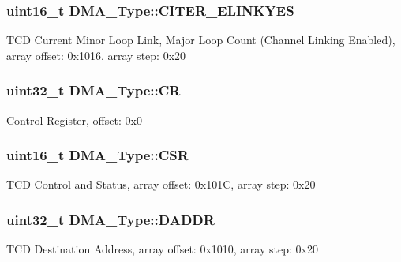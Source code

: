 \subsubsection[{\texorpdfstring{C\+I\+T\+E\+R\+\_\+\+E\+L\+I\+N\+K\+Y\+ES}{CITER_ELINKYES}}]{ uint16\+\_\+t D\+M\+A\+\_\+\+Type\+::\+C\+I\+T\+E\+R\+\_\+\+E\+L\+I\+N\+K\+Y\+ES}\hypertarget{structDMA__Type_a13bef8e34ec3cc08fe52f0afd35fa9b1}{}\label{structDMA__Type_a13bef8e34ec3cc08fe52f0afd35fa9b1}
T\+CD Current Minor Loop Link, Major Loop Count (Channel Linking Enabled), array offset\+: 0x1016, array step\+: 0x20 
\subsubsection[{\texorpdfstring{CR}{CR}}]{ uint32\+\_\+t D\+M\+A\+\_\+\+Type\+::\+CR}\hypertarget{structDMA__Type_a664cf4b368fc388926bd0e6d6822248f}{}\label{structDMA__Type_a664cf4b368fc388926bd0e6d6822248f}
Control Register, offset\+: 0x0 
\subsubsection[{\texorpdfstring{C\+SR}{CSR}}]{ uint16\+\_\+t D\+M\+A\+\_\+\+Type\+::\+C\+SR}\hypertarget{structDMA__Type_a60b7ef52775eb2e3a56852fdeacc0975}{}\label{structDMA__Type_a60b7ef52775eb2e3a56852fdeacc0975}
T\+CD Control and Status, array offset\+: 0x101C, array step\+: 0x20 
\subsubsection[{\texorpdfstring{D\+A\+D\+DR}{DADDR}}]{ uint32\+\_\+t D\+M\+A\+\_\+\+Type\+::\+D\+A\+D\+DR}\hypertarget{structDMA__Type_ae9784fb6be739584197fa99d875dcfe8}{}\label{structDMA__Type_ae9784fb6be739584197fa99d875dcfe8}
T\+CD Destination Address, array offset\+: 0x1010, array step\+: 0x20 
